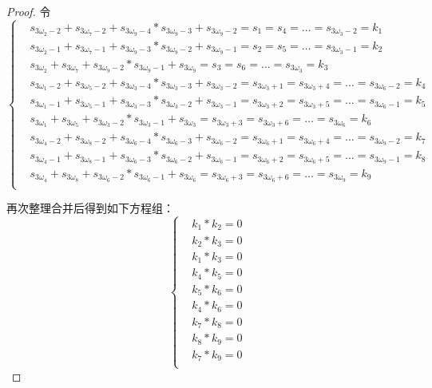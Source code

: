 \begin{thm}
\begin{proof}
令
\begin{equation}
\left\{
\begin{aligned}
&s_{3\omega_{2}-2}+s_{3\omega_{7}-2}+s_{3\omega_{9}-4}*s_{3\omega_{9}-3}+s_{3\omega_{9}-2}=s_{1}=s_{4}=\ldots=s_{3\omega_{3}-2}=k_{1}\\
&s_{3\omega_{2}-1}+s_{3\omega_{7}-1}+s_{3\omega_{9}-3}*s_{3\omega_{9}-2}+s_{3\omega_{9}-1}=s_{2}=s_{5}=\ldots=s_{3\omega_{3}-1}=k_{2}\\
&s_{3\omega_{2}}+s_{3\omega_{7}}+s_{3\omega_{9}-2}*s_{3\omega_{9}-1}+s_{3\omega_{9}}=s_{3}=s_{6}=\ldots=s_{3\omega_{3}}=k_{3}\\
&s_{3\omega_{1}-2}+s_{3\omega_{5}-2}+s_{3\omega_{3}-4}*s_{3\omega_{3}-3}+s_{3\omega_{3}-2}=s_{3\omega_{3}+1}=s_{3\omega_{3}+4}=\ldots=s_{3\omega_{6}-2}=k_{4}\\
&s_{3\omega_{1}-1}+s_{3\omega_{5}-1}+s_{3\omega_{3}-3}*s_{3\omega_{3}-2}+s_{3\omega_{3}-1}=s_{3\omega_{3}+2}=s_{3\omega_{3}+5}=\ldots=s_{3\omega_{6}-1}=k_{5}\\
&s_{3\omega_{1}}+s_{3\omega_{5}}+s_{3\omega_{3}-2}*s_{3\omega_{3}-1}+s_{3\omega_{3}}=s_{3\omega_{3}+3}=s_{3\omega_{3}+6}=\ldots=s_{3\omega_{6}}=k_{6}\\
&s_{3\omega_{4}-2}+s_{3\omega_{8}-2}+s_{3\omega_{6}-4}*s_{3\omega_{6}-3}+s_{3\omega_{6}-2}=s_{3\omega_{6}+1}=s_{3\omega_{6}+4}=\ldots=s_{3\omega_{9}-2}=k_{7}\\
&s_{3\omega_{4}-1}+s_{3\omega_{8}-1}+s_{3\omega_{6}-3}*s_{3\omega_{6}-2}+s_{3\omega_{6}-1}=s_{3\omega_{6}+2}=s_{3\omega_{6}+5}=\ldots=s_{3\omega_{9}-1}=k_{8}\\
&s_{3\omega_{4}}+s_{3\omega_{8}}+s_{3\omega_{6}-2}*s_{3\omega_{6}-1}+s_{3\omega_{6}}=s_{3\omega_{6}+3}=s_{3\omega_{6}+6}=\ldots=s_{3\omega_{9}}=k_{9}\\
\end{aligned}
\right.
\end{equation}


再次整理合并后得到如下方程组：
\begin{equation}
\label{eq:trivium_cycle_3_param}
\left\{
\begin{aligned}
&k_{1}*k_{2}=0\\
&k_{2}*k_{3}=0\\
&k_{1}*k_{3}=0\\
&k_{4}*k_{5}=0\\
&k_{5}*k_{6}=0\\
&k_{4}*k_{6}=0\\
&k_{7}*k_{8}=0\\
&k_{8}*k_{9}=0\\
&k_{7}*k_{9}=0\\
\end{aligned}
\right.
\end{equation}



\end{proof}
\end{thm}
